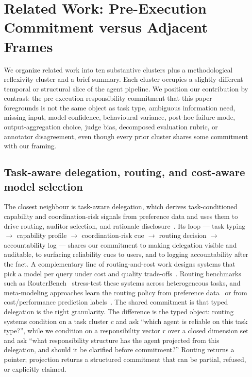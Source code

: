 \section{Related Work: Pre-Execution Commitment versus Adjacent Frames}
\label{sec:related}

We organize related work into ten substantive clusters plus a methodological reflexivity cluster and a brief summary. Each cluster occupies a slightly different temporal or structural slice of the agent pipeline. We position our contribution by contrast: the pre-execution responsibility commitment that this paper foregrounds is not the same object as task type, ambiguous information need, missing input, model confidence, behavioural variance, post-hoc failure mode, output-aggregation choice, judge bias, decomposed evaluation rubric, or annotator disagreement, even though every prior cluster shares some commitment with our framing.

\subsection{Task-aware delegation, routing, and cost-aware model selection}
\label{sec:related:task_aware}

The closest neighbour is task-aware delegation, which derives task-conditioned capability and coordination-risk signals from preference data and uses them to drive routing, auditor selection, and rationale disclosure~\cite{taskaware2026}. Its loop --- task typing $\to$ capability profile $\to$ coordination-risk cue $\to$ routing decision $\to$ accountability log --- shares our commitment to making delegation visible and auditable, to surfacing reliability cues to users, and to logging accountability after the fact. A complementary line of routing-and-cost work designs systems that pick a model per query under cost and quality trade-offs~\cite{ong2024routellm, routerbench2024, flyswatcannon2023, cqr2024costefficient, chen2023reducecost}. Routing benchmarks such as RouterBench~\cite{routerbench2024} stress-test these systems across heterogeneous tasks, and meta-modeling approaches learn the routing policy from preference data~\cite{ong2024routellm} or from cost/performance prediction labels~\cite{flyswatcannon2023}. The shared commitment is that typed delegation is the right granularity. The difference is the typed object: routing systems condition on a task cluster $c$ and ask ``which agent is reliable on this task type?'', while we condition on a responsibility vector $r$ over a closed dimension set and ask ``what responsibility structure has the agent projected from this delegation, and should it be clarified before commitment?'' Routing returns a pointer; projection returns a structured commitment that can be partial, refused, or explicitly claimed.

